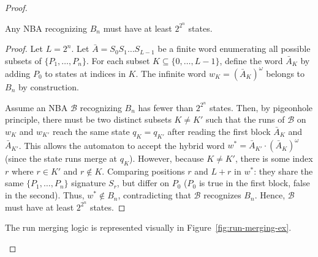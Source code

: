 \begin{proof}
\begin{lemma}
Any NBA recognizing $B_n$ must have at least $2^{2^n}$ states.
\end{lemma}
\begin{proof}
Let $L = 2^n$. Let $\bar{A} = S_0 S_1 \dots S_{L-1}$ be a finite word enumerating all possible subsets of $\{P_1, \dots, P_n\}$. 
For each subset $K \subseteq \{0, \dots, L-1\}$, define the word $\bar{A}_K$ by adding $P_0$ to states at indices in $K$. 
The infinite word $w_K = (\bar{A}_K)^\omega$ belongs to $B_n$ by construction.

Assume an NBA $\mathcal{B}$ recognizing $B_n$ has fewer than $2^{2^n}$ states. Then, by pigeonhole principle, there must be two distinct subsets $K \neq K'$ such that the runs of $\mathcal{B}$ on $w_K$ and $w_{K'}$ reach the same state $q_K = q_{K'}$ after reading the first block $\bar{A}_K$ and $\bar{A}_{K'}$.
This allows the automaton to accept the hybrid word $w^* = \bar{A}_{K'} \cdot (\bar{A}_K)^\omega$ (since the state runs merge at $q_K$).
However, because $K \neq K'$, there is some index $r$ where $r \in K'$ and $r \notin K$. Comparing positions $r$ and $L+r$ in $w^*$: they share the same $\{P_1, \dots, P_n\}$ signature $S_r$, but differ on $P_0$ ($P_0$ is true in the first block, false in the second). Thus, $w^* \notin B_n$, contradicting that $\mathcal{B}$ recognizes $B_n$. Hence, $\mathcal{B}$ must have at least $2^{2^n}$ states.
\end{proof}

The run merging logic is represented visually in Figure~\ref{fig:run-merging-ex}.

\begin{center}
\end{center}
\end{proof}
